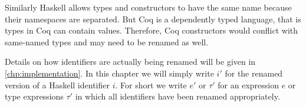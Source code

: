 Similarly Haskell allows types and constructors to have the same name because their namespaces are separated.
But Coq is a dependently typed language, that is types in Coq can contain values.
Therefore, Coq constructors would conflict with same-named types and may need to be renamed as well.

Details on how identifiers are actually being renamed will be given in \autoref{chp:implementation}.
In this chapter we will simply write $i'$ for the renamed version of a Haskell identifier $i$.
For short we write $e'$ or $\tau'$ for an expression $e$ or type expressions $\tau'$ in which all identifiers have been renamed appropriately.
